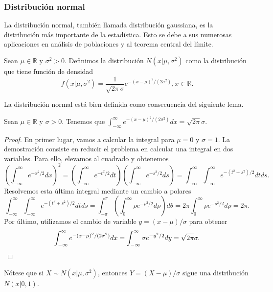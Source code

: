 \documentclass{article}
\begin{document}
\subsubsection{Distribución normal}

La distribución normal, también llamada distribución gaussiana, es la distribución más importante de la estadística. Esto se debe a sus numerosas aplicaciones en análisis de poblaciones y al teorema central del límite.

\begin{definition}
    Sean $\mu \in \mathbb{R}$ y $\sigma^2 > 0$. Definimos la distribución $N(x | \mu, \sigma^2)$ como la distribución que tiene función de densidad
    \[f(x | \mu, \sigma^2) = \frac{1}{\sqrt{2\pi}\sigma}e^{-(x-\mu)^2 / (2\sigma^2)}, x \in \mathbb{R}.\]
\end{definition}


La distribución normal está bien definida como consecuencia del siguiente lema.
\begin{lem}
    Sean $\mu \in \mathbb{R}$ y $\sigma > 0$. Tenemos que $\int_{-\infty}^\infty e^{-(x-\mu)^2 / (2\sigma^2)}dx = \sqrt{2\pi}\sigma.$
\end{lem}
\begin{proof}
    En primer lugar, vamos a calcular la integral para $\mu = 0$ y $\sigma = 1$. La demostración consiste en reducir el problema en calcular una integral en dos variables. Para ello, elevamos al cuadrado y obtenemos
    \[\left(\int_{-\infty}^\infty e^{-x^2 / 2}dx\right)^2 = \left(\int_{-\infty}^\infty e^{-t^2 / 2}dt\right) \left(\int_{-\infty}^\infty e^{-s^2 / 2}ds \right) = \int_{-\infty}^\infty \int_{-\infty}^\infty e^{-(t^2+s^2) / 2} dt ds. \]
    Resolvemos esta última integral mediante un cambio a polares
    \[\int_{-\infty}^\infty \int_{-\infty}^\infty e^{-(t^2+s^2) / 2} dt ds = \int_{-\pi}^\pi \left(\int_{0}^\infty \rho e^{-\rho^2 / 2} d\rho \right) d\theta = 2\pi \int_{0}^\infty \rho e^{-\rho^2 / 2} d\rho = 2\pi.\]
    Por último, utilizamos el cambio de variable $y = (x - \mu) / \sigma$ para obtener
    \[\int_{-\infty}^\infty e^{-(x-\mu)^2 / (2\sigma^2)}dx = \int_{-\infty}^\infty \sigma e^{-y^2 / 2}dy = \sqrt{2\pi}\sigma. \qedhere\]
\end{proof}

Nótese que si $X \sim N(x | \mu, \sigma^2)$, entonces $Y = (X - \mu)/\sigma$ sigue una distribución $N(x|0,1)$.
\end{document}
